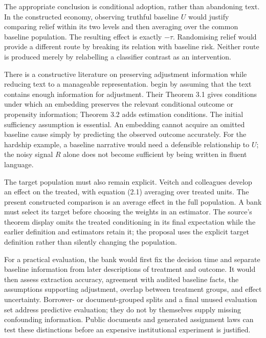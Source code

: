 The appropriate conclusion is conditional adoption, rather than abandoning
text. In the constructed economy, observing truthful baseline $U$ would
justify comparing relief within its two levels and then averaging over the
common baseline population. The resulting effect is exactly $-\tau$.
Randomising relief would provide a different route by breaking its relation
with baseline risk. Neither route is produced merely by relabelling a
classifier contrast as an intervention.

There is a constructive literature on preserving adjustment information
while reducing text to a manageable representation. \citet{closure30veitch}
begin by assuming that the text contains enough information for adjustment.
Their Theorem 3.1 gives conditions under which an embedding preserves the
relevant conditional outcome or propensity information; Theorem 3.2 adds
estimation conditions. The initial sufficiency assumption is essential.
An embedding cannot acquire an omitted baseline cause simply by predicting
the observed outcome accurately. For the hardship example, a baseline
narrative would need a defensible relationship to $U$; the noisy signal $R$
alone does not become sufficient by being written in fluent language.

The target population must also remain explicit. Veitch and colleagues
develop an effect on the treated, with equation (2.1) averaging over treated
units. The present constructed comparison is an average effect in the full
population. A bank must select its target before choosing the weights in an
estimator. The source's theorem display omits the treated conditioning in
its final expectation while the earlier definition and estimators retain it;
the proposal uses the explicit target definition rather than silently
changing the population.
\citep[Section 2, equations (2.1)--(2.3); Section 3, Theorems 3.1--3.2]
{closure30veitch}

For a practical evaluation, the bank would first fix the decision time and
separate baseline information from later descriptions of treatment and
outcome. It would then assess extraction accuracy, agreement with audited
baseline facts, the assumptions supporting adjustment, overlap between
treatment groups, and effect uncertainty. Borrower- or document-grouped
splits and a final unused evaluation set address predictive evaluation;
they do not by themselves supply missing confounding information. Public
documents and generated assignment laws can test these distinctions before
an expensive institutional experiment is justified.

